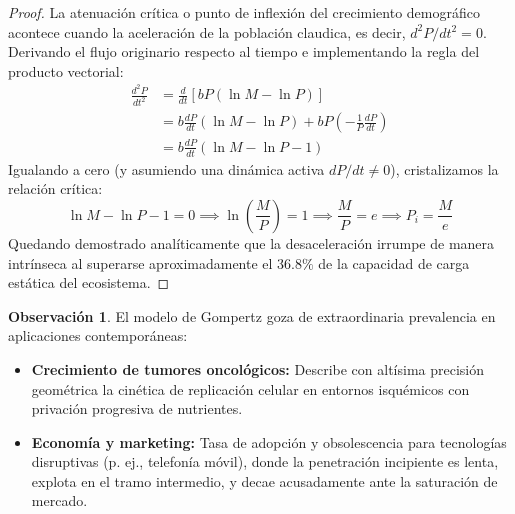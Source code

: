 \documentclass[11pt,a4paper]{article}
\theoremstyle{definition}
\newtheorem{remark}{Observación}[section]
\theoremstyle{plain}
\begin{document}
\begin{proof}
La atenuación crítica o punto de inflexión del crecimiento demográfico acontece cuando la aceleración de la población claudica, es decir, $d^2P/dt^2 = 0$. Derivando el flujo originario respecto al tiempo e implementando la regla del producto vectorial:
\begin{align*}
    \frac{d^2P}{dt^2} &= \frac{d}{dt} \left[ bP (\ln M - \ln P) \right] \\
    &= b \frac{dP}{dt} (\ln M - \ln P) + bP \left(-\frac{1}{P}\frac{dP}{dt}\right) \\
    &= b \frac{dP}{dt} (\ln M - \ln P - 1)
\end{align*}
Igualando a cero (y asumiendo una dinámica activa $dP/dt \neq 0$), cristalizamos la relación crítica:
\begin{equation*}
    \ln M - \ln P - 1 = 0 \implies \ln\left(\frac{M}{P}\right) = 1 \implies \frac{M}{P} = e \implies P_i = \frac{M}{e}
\end{equation*}
Quedando demostrado analíticamente que la desaceleración irrumpe de manera intrínseca al superarse aproximadamente el $36.8\%$ de la capacidad de carga estática del ecosistema.
\end{proof}

\begin{remark}
El modelo de Gompertz goza de extraordinaria prevalencia en aplicaciones contemporáneas:
\begin{itemize}
    \item \textbf{Crecimiento de tumores oncológicos:} Describe con altísima precisión geométrica la cinética de replicación celular en entornos isquémicos con privación progresiva de nutrientes.
    \item \textbf{Economía y marketing:} Tasa de adopción y obsolescencia para tecnologías disruptivas (p. ej., telefonía móvil), donde la penetración incipiente es lenta, explota en el tramo intermedio, y decae acusadamente ante la saturación de mercado.
\end{itemize}
\end{remark}
\end{document}
